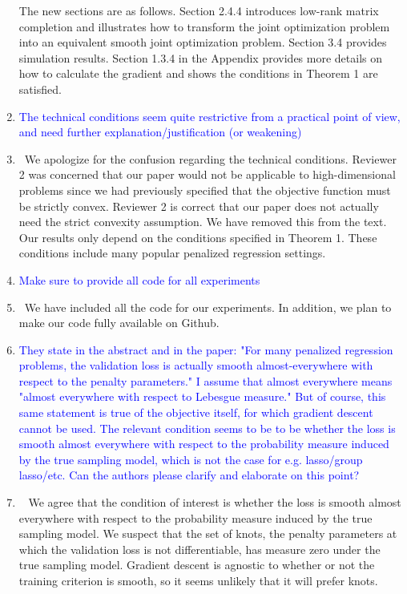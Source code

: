 \documentclass[]{article}
\newcommand{\point}[1]{\item \textcolor{blue}{#1}}
\newcommand{\reply}{\item[]\ }
\begin{document}
\begin{enumerate}
		The new sections are as follows. Section 2.4.4 introduces low-rank matrix completion and illustrates how to transform the joint optimization problem into an equivalent smooth joint optimization problem. Section 3.4 provides simulation results. Section 1.3.4 in the Appendix provides more details on how to calculate the gradient and shows the conditions in Theorem 1 are satisfied. 
		
		
		\point{The technical conditions seem quite restrictive from a practical point of view, and need further explanation/justification (or weakening)}
		
		\reply We apologize for the confusion regarding the technical conditions. Reviewer 2 was concerned that our paper would not be applicable to high-dimensional problems since we had previously specified that the objective function must be strictly convex. Reviewer 2 is correct that our paper does not actually need the strict convexity assumption. We have removed this from the text. Our results only depend on the conditions specified in Theorem 1. These conditions include many popular penalized regression settings.
		
		\point{Make sure to provide all code for all experiments}
		
		\reply We have included all the code for our experiments. In addition, we plan to make our code fully available on Github.
		
		\point{They state in the abstract and in the paper: "For many penalized regression problems, the validation loss is actually smooth almost-everywhere with respect to the penalty parameters."  I assume that almost everywhere means "almost everywhere with respect to Lebesgue measure."  But of course, this same statement is true of the objective itself, for which gradient descent cannot be used.  The relevant condition seems to be to be whether the loss is smooth almost everywhere with respect to the probability measure induced by the true sampling model, which is not the case for e.g. lasso/group lasso/etc.  Can the authors please clarify and elaborate on this point?}
		
		\reply 	
		We agree that the condition of interest is whether the loss is smooth almost everywhere with respect to the probability measure induced by the true sampling model. We suspect that the set of knots, the penalty parameters at which the validation loss is not differentiable, has measure zero under the true sampling model. Gradient descent is agnostic to whether or not the training criterion is smooth, so it seems unlikely that it will prefer knots.
		

\end{enumerate}
\end{document}
